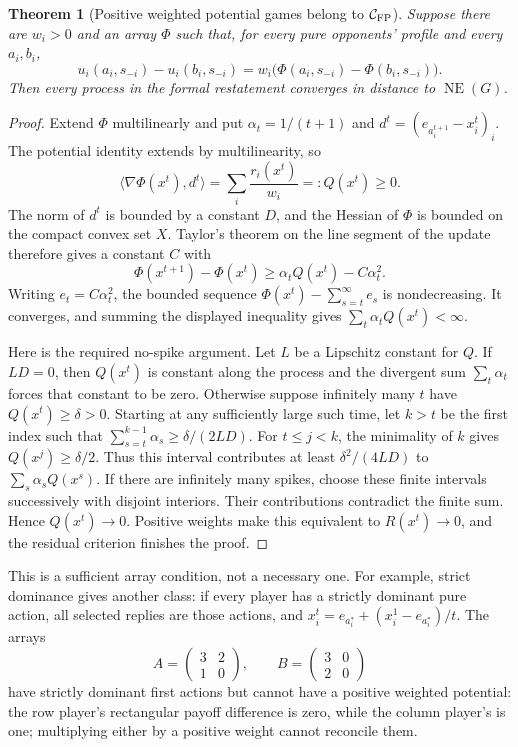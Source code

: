 \documentclass[11pt,a4paper]{article}
\newcommand{\NE}{\operatorname{NE}}
\newtheorem{theorem}{Theorem}[section]
\theoremstyle{definition}
\theoremstyle{remark}
\begin{document}
\begin{theorem}[Positive weighted potential games belong to $\mathcal C_{\rm FP}$]
Suppose there are $w_i>0$ and an array $\Phi$ such that, for every pure opponents'
profile and every $a_i,b_i$,
\[
 u_i(a_i,s_{-i})-u_i(b_i,s_{-i})
 =w_i\bigl(\Phi(a_i,s_{-i})-\Phi(b_i,s_{-i})\bigr).
\]
Then every process in the formal restatement converges in distance to $\NE(G)$.
\end{theorem}
\begin{proof}
Extend $\Phi$ multilinearly and put $\alpha_t=1/(t+1)$ and
$d^t=(e_{a_i^{t+1}}-x_i^t)_i$. The potential identity extends by multilinearity,
so
\[
 \langle\nabla\Phi(x^t),d^t\rangle
 =\sum_i\frac{r_i(x^t)}{w_i}=:Q(x^t)\geq0.
\]
The norm of $d^t$ is bounded by a constant $D$, and the Hessian of $\Phi$ is bounded
on the compact convex set $X$. Taylor's theorem on the line segment of the update
therefore gives a constant $C$ with
\[
 \Phi(x^{t+1})-\Phi(x^t)\geq\alpha_tQ(x^t)-C\alpha_t^2.
\]
Writing $e_t=C\alpha_t^2$, the bounded sequence
$\Phi(x^t)-\sum_{s=t}^{\infty}e_s$ is nondecreasing. It converges, and summing the
displayed inequality gives $\sum_t\alpha_tQ(x^t)<\infty$.

Here is the required no-spike argument. Let $L$ be a Lipschitz constant for $Q$.
If $LD=0$, then $Q(x^t)$ is constant along the process and the divergent sum
$\sum_t\alpha_t$ forces that constant to be zero. Otherwise suppose infinitely
many $t$ have $Q(x^t)\geq\delta>0$. Starting at any sufficiently large such time,
let $k>t$ be the first index such that
$\sum_{s=t}^{k-1}\alpha_s\geq\delta/(2LD)$. For $t\leq j<k$, the minimality of
$k$ gives $Q(x^j)\geq\delta/2$. Thus this interval contributes at least
$\delta^2/(4LD)$ to $\sum_s\alpha_sQ(x^s)$. If there are infinitely many spikes,
choose these finite intervals successively with disjoint interiors. Their
contributions contradict the finite sum. Hence $Q(x^t)\to0$. Positive weights
make this equivalent to $R(x^t)\to0$, and the residual criterion finishes the proof.
\end{proof}
This is a sufficient array condition, not a necessary one. For example, strict
dominance gives another class: if every player has a strictly dominant pure action,
all selected replies are those actions, and
$x_i^t=e_{a_i^*}+(x_i^1-e_{a_i^*})/t$. The arrays
\[
 A=\begin{pmatrix}3&2\\1&0\end{pmatrix},\qquad
 B=\begin{pmatrix}3&0\\2&0\end{pmatrix}
\]
have strictly dominant first actions but cannot have a positive weighted potential:
the row player's rectangular payoff difference is zero, while the column player's
is one; multiplying either by a positive weight cannot reconcile them.
\end{document}
